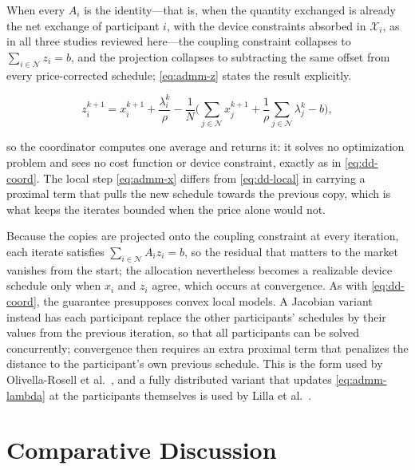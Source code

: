 \documentclass[conference]{IEEEtran}
\begin{document}
When every $A_i$ is the identity---that is, when the quantity exchanged is already the net exchange of participant $i$, with the device constraints absorbed in $\mathcal{X}_i$, as in all three studies reviewed here---the coupling constraint collapses to $\sum_{i\in\mathcal{N}} z_i = b$, and the projection collapses to subtracting the same offset from every price-corrected schedule; \eqref{eq:admm-z} states the result explicitly.

\begin{equation}
z_i^{k+1} = x_i^{k+1} + \frac{\lambda_i^{k}}{\rho} - \frac{1}{N}\Big( \sum_{j\in\mathcal{N}} x_j^{k+1} + \frac{1}{\rho}\sum_{j\in\mathcal{N}} \lambda_j^{k} - b \Big),
\label{eq:admm-z}
\end{equation}

so the coordinator computes one average and returns it: it solves no optimization problem and sees no cost function or device constraint, exactly as in \eqref{eq:dd-coord}. The local step \eqref{eq:admm-x} differs from \eqref{eq:dd-local} in carrying a proximal term that pulls the new schedule towards the previous copy, which is what keeps the iterates bounded when the price alone would not.

Because the copies are projected onto the coupling constraint at every iteration, each iterate satisfies $\sum_{i\in\mathcal{N}} A_i z_i = b$, so the residual that matters to the market vanishes from the start; the allocation nevertheless becomes a realizable device schedule only when $x_i$ and $z_i$ agree, which occurs at convergence. As with \eqref{eq:dd-coord}, the guarantee presupposes convex local models. A Jacobian variant instead has each participant replace the other participants' schedules by their values from the previous iteration, so that all participants can be solved concurrently; convergence then requires an extra proximal term that penalizes the distance to the participant's own previous schedule. This is the form used by Olivella-Rosell et al.\ \cite{OlivellaRosell2020}, and a fully distributed variant that updates \eqref{eq:admm-lambda} at the participants themselves is used by Lilla et al.\ \cite{Lilla2020}.


\section{Comparative Discussion}
\label{sec:discussion}

\end{document}
